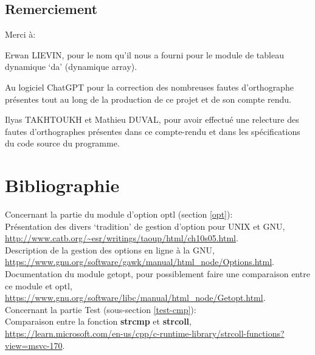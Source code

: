 \documentclass[12pt]{article}
\begin{document}
    \subsection{Remerciement}

    Merci à\@: 

    Erwan LIEVIN, pour le nom qu'il nous a fourni pour le module de tableau 
    dynamique `da' (dynamique array).

    Au logiciel ChatGPT pour la correction des nombreuses fautes d'orthographe 
    présentes tout au long de la production de ce projet et de son compte rendu.

    Ilyas TAKHTOUKH et Mathieu DUVAL, pour avoir effectué une relecture des 
    fautes d'orthographes présentes dans ce compte-rendu et dans les 
    spécifications du code source du programme.

    \newpage

    \section{Bibliographie}
        \noindent Concernant la partie du module d'option optl 
        (section \ref{opt}):\\ Présentation des divers `tradition' de gestion 
        d'option pour UNIX et GNU, 
        \url{http://www.catb.org/~esr/writings/taoup/html/ch10s05.html}.\\
        Description de la gestion des options en ligne à la GNU, 
        \url{https://www.gnu.org/software/gawk/manual/html_node/Options.html}.\\
        Documentation du module getopt, pour possiblement faire une comparaison 
        entre ce module et optl, 
        \url{https://www.gnu.org/software/libc/manual/html_node/Getopt.html}.\\
        \noindent Concernant la partie Test (sous-section \ref{test-cmp}):\\
        Comparaison entre la fonction \textbf{strcmp} et \textbf{strcoll}, 
        \url{https://learn.microsoft.com/en-us/cpp/c-runtime-library/strcoll-functions?view=msvc-170}.
\end{document}
